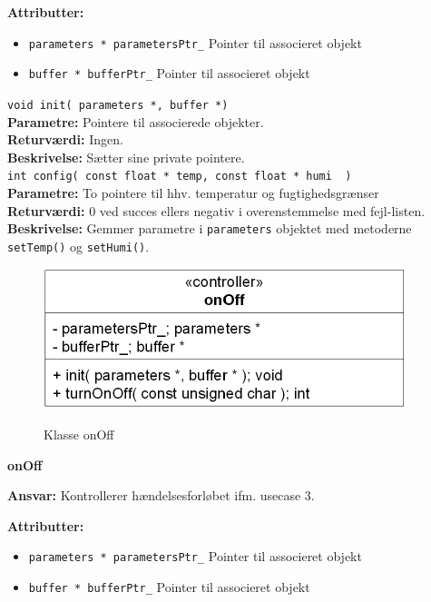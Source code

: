 \textbf{Attributter:}
\begin{itemize}
	\item \verb+parameters * parametersPtr_+ Pointer til associeret objekt
	\item \verb+buffer * bufferPtr_+ Pointer til associeret objekt
\end{itemize}

\verb+void init( parameters *, buffer *)+\\
\textbf{Parametre:} Pointere til associerede objekter. \\
\textbf{Returværdi:} Ingen. \\
\textbf{Beskrivelse:} Sætter sine private pointere. \\

\verb+int config( const float * temp, const float * humi  )+ \\
\textbf{Parametre:} To pointere til hhv. temperatur og fugtighedsgrænser \\
\textbf{Returværdi:} 0 ved succes ellers negativ i overenstemmelse med fejl-listen. \\
\textbf{Beskrivelse:} Gemmer parametre i \verb+parameters+ objektet med metoderne \verb+setTemp()+ og \verb+setHumi()+. \\

\begin{figure}[htbp] \centering
{\includegraphics[scale=1.3]{filer/design/Klassediagrammer/sw_psoc_onOff}}
\caption{Klasse onOff}
\label{fig:sw_psoc_class_onOff}
\end{figure} 

{\centering
\textbf{onOff}\par
}
\textbf{Ansvar:} Kontrollerer hændelsesforløbet ifm. usecase 3. \

\textbf{Attributter:}
\begin{itemize}
	\item \verb+parameters * parametersPtr_+ Pointer til associeret objekt
	\item \verb+buffer * bufferPtr_+ Pointer til associeret objekt
\end{itemize}


